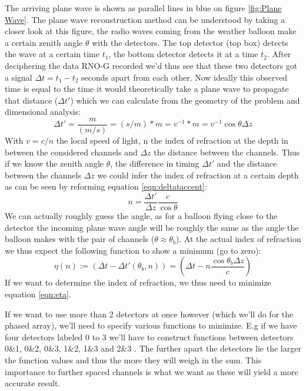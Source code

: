 The arriving plane wave is shown as parallel lines in blue on figure \ref{fig:Plane Wave}. The
plane wave reconstruction method can be understood by taking a closer look at this figure, 
the radio waves coming from the weather balloon make a certain zenith angle $\theta$ with the detectors. The top detector (top box)
detects the wave at a certain time $t_1$, the bottom detector detects it at a
time $t_2$. After deciphering the data RNO-G recorded we'd thus see that these
two detectors got a signal $\Delta t = t_1 - t_2$ seconds apart from each other.
Now ideally this observed time is equal to the time it would theoretically take a plane
wave to propagate that distance ($\Delta t'$) which we can calculate from the geometry of
the problem and dimensional analysis:
\begin{equation}
	\Delta t' = \frac{m}{(m/s)} = (s/m)*m = v^{-1} * m = v^{-1} \cos\theta \Delta z
	\label{eqn:deltataccent}
\end{equation}
With $v = c/n$ the local speed of light, n the index of refraction at the depth in between
the considered channels and $\Delta z$ the distance between the channels. 
Thus if we know the zenith angle $\theta$, the difference in timing $\Delta t'$ and the distance between the channels $\Delta z$
we could infer the index of refraction at a certain depth as can be seen by reforming equation \ref{eqn:deltataccent}:
\begin{equation}
	n = \frac{\Delta t'}{\Delta z} \frac{c}{\cos\theta}
\end{equation}
We can actually roughly guess the angle, as for a balloon flying close to the
detector the incoming plane wave angle will be roughly the same as the angle the balloon
makes with the pair of channels ($\theta\approx\theta_b$).
At the actual index of refraction we thus expect the following function to show a 
minimum (go to zero):
\begin{equation}
	\eta(n) :=  (\Delta t - \Delta t'(\theta_b,n)) = \left(\Delta t
	- n\frac{\cos\theta_b \Delta z}{c}\right)
  	\label{eqn:eta}
\end{equation}
If we want to determine the index of refraction, 
we thus need to minimize equation \ref{eqn:eta}.

If we want to use more than 2 detectors at once however (which we'll
do for the phased array), we'll need to specify various functions to
minimize.  E.g if we have four detectors labeled 0 to 3 we'll have
to construct functions between detectors 0\&1, 0\&2, 0\&3, 1\&2,
1\&3 and 2\&3 . The further apart the detectors lie the larger the
function values and thus the more they will weigh in the sum. This importance to
further spaced channels is what we want as these will yield a more
accurate result. 
